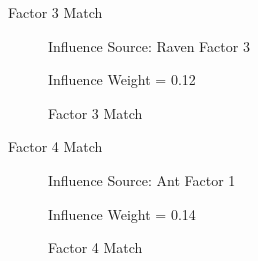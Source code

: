 \documentclass{beamer}
\begin{document}
\begin{frame}{Factor 3 Match}
\begin{figure}%
    \centering
    \qquad
    \caption{Factor 3 Match}%
    \label{fig:com3}%
    Influence Source: Raven Factor 3 
    \par Influence Weight = 0.12
\end{figure}
\end{frame}

\begin{frame}{Factor 4 Match}
\begin{figure}%
    \centering
    \qquad
    \caption{Factor 4 Match}%
    \label{fig:com4}%
    Influence Source: Ant Factor 1 
    \par Influence Weight = 0.14
\end{figure}
\end{frame}
\end{document}
